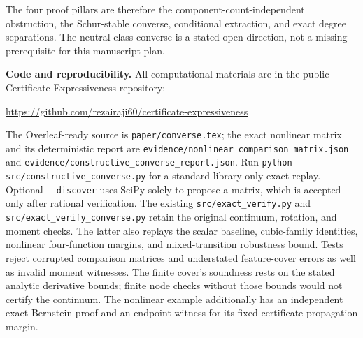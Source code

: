 \documentclass[10pt,letterpaper]{article}
\theoremstyle{remark}
\begin{document}
The four proof pillars are therefore the component-count-independent
obstruction, the Schur-stable converse, conditional extraction, and exact
degree separations. The neutral-class converse is a stated open direction,
not a missing prerequisite for this manuscript plan.

\textbf{Code and reproducibility.}
All computational materials are in the public Certificate Expressiveness repository:
\begin{center}
\url{https://github.com/rezairaji60/certificate-expressiveness}
\end{center}
The Overleaf-ready source is \texttt{paper/converse.tex}; the exact nonlinear matrix and its deterministic report are
\texttt{evidence/nonlinear\_comparison\_matrix.json} and
\texttt{evidence/constructive\_converse\_report.json}.
Run \texttt{python src/constructive\_converse.py} for a standard-library-only exact replay.
Optional \texttt{-{}-discover} uses SciPy solely to propose a matrix, which is accepted only after rational verification.
The existing \texttt{src/exact\_verify.py} and
\texttt{src/exact\_verify\_converse.py} retain the original continuum, rotation, and moment checks. The latter also replays the scalar baseline, cubic-family identities, nonlinear four-function margins, and mixed-transition robustness bound. Tests reject corrupted comparison matrices and understated feature-cover errors as well as invalid moment witnesses.
The finite cover's soundness rests on the stated analytic derivative bounds; finite node checks without those bounds would not certify the continuum. The nonlinear example additionally has an independent exact Bernstein proof and an endpoint witness for its fixed-certificate propagation margin.
\end{document}
